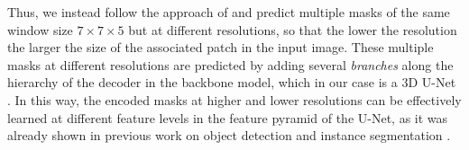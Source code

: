 Thus, we instead follow the approach of \cite{Gao_2019_ICCV} and predict multiple \maskname masks of the same window size $7 \times 7 \times 5$ but at different resolutions, so that the lower the resolution the larger the size of the associated patch in the input image. 
These multiple masks at different resolutions are predicted by adding several \emph{\encBr branches} along the hierarchy of the decoder in the backbone model, which in our case is a 3D U-Net \cite{ronneberger2015u,cciccek20163d}. 
In this way, the encoded \maskname masks at higher and lower resolutions can be effectively learned at different feature levels in the feature pyramid of the U-Net, as it was already shown in previous work on object detection and instance segmentation \cite{Gao_2019_ICCV,lin2017feature}.



